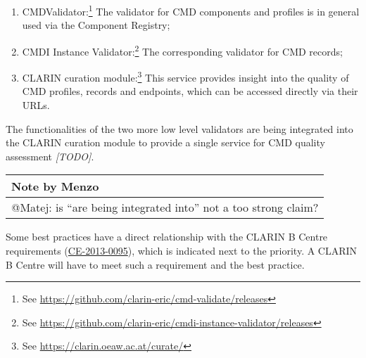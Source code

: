 \begin{enumerate}
\def\labelenumi{\arabic{enumi}.}
\tightlist
\item
  CMDValidator:\footnote{See
    \url{https://github.com/clarin-eric/cmd-validate/releases}} The
  validator for CMD components and profiles is in general used via the
  Component Registry;
\item
  CMDI Instance Validator:\footnote{See
    \url{https://github.com/clarin-eric/cmdi-instance-validator/releases}}
  The corresponding validator for CMD records;
\item
  CLARIN curation module:\footnote{See
    \url{https://clarin.oeaw.ac.at/curate/}} This service provides
  insight into the quality of CMD profiles, records and endpoints, which
  can be accessed directly via their URLs.
\end{enumerate}

The functionalities of the two more low level validators are being
integrated into the CLARIN curation module to provide a single service
for CMD quality assessment \emph{{[}TODO{]}}.

\begin{longtable}[c]{@{}l@{}}
\toprule
Note by Menzo\tabularnewline
\midrule
\endhead
@Matej: is ``are being integrated into'' not a too strong
claim?\tabularnewline
\bottomrule
\end{longtable}

Some best practices have a direct relationship with the CLARIN B Centre
requirements (\href{http://hdl.handle.net/11372/DOC-78}{CE-2013-0095}),
which is indicated next to the priority. A CLARIN B Centre will have to
meet such a requirement and the best practice.
